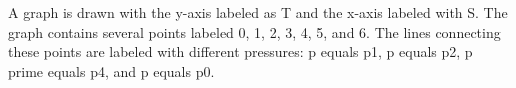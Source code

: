 A graph is drawn with the y-axis labeled as T and the x-axis labeled with S. The graph contains several points labeled 0, 1, 2, 3, 4, 5, and 6. The lines connecting these points are labeled with different pressures: p equals p1, p equals p2, p prime equals p4, and p equals p0.